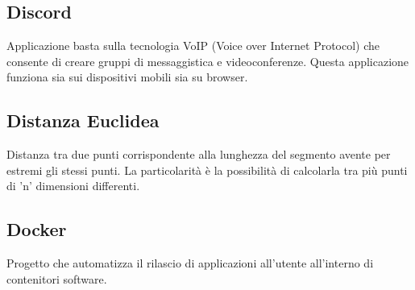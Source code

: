 \subsection*{Discord}
Applicazione  basta sulla tecnologia VoIP (Voice over Internet Protocol) che consente di creare gruppi di messaggistica e videoconferenze. Questa applicazione funziona sia sui dispositivi mobili sia su browser.

\subsection*{Distanza Euclidea}
Distanza tra due punti corrispondente alla lunghezza del segmento avente per estremi gli stessi punti. La particolarità è la possibilità di calcolarla tra più punti di 'n' dimensioni differenti.

\subsection*{Docker}
Progetto  che automatizza il rilascio di applicazioni all'utente all'interno di contenitori software.


